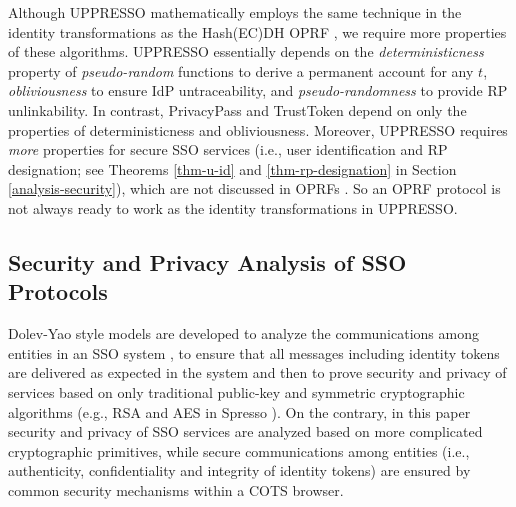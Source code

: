 Although UPPRESSO mathematically employs the same technique in the identity transformations as the Hash(EC)DH OPRF \cite{oprf-proved,voprf-proved}, we require more properties of these algorithms. %
UPPRESSO essentially 
depends on the \emph{deterministicness} property of \emph{pseudo-random} functions to derive a permanent account for any $t$, \emph{obliviousness} to ensure IdP untraceability, 
and \emph{pseudo-randomness} to provide RP unlinkability. 
In contrast, PrivacyPass and TrustToken \cite{privacypass,trusttoken} depend on only the properties of deterministicness and obliviousness.
Moreover, UPPRESSO requires \emph{more} properties for secure SSO services (i.e., user identification and RP designation; see Theorems \ref{thm-u-id} and \ref{thm-rp-designation} in Section \ref{analysis-security}),
    which are not discussed in OPRFs \cite{sok-oprf,oprf-proved,voprf-proved}.
So an OPRF protocol is not always ready to work as the identity transformations in UPPRESSO.

\subsection{Security and Privacy Analysis of SSO Protocols}
Dolev-Yao style models are developed to analyze the communications among entities in an SSO system \cite{SPRESSO,BrowserID,FettKS14}, to ensure that all messages including identity tokens are delivered as expected in the system
        and then to prove security and privacy of services 
        based on only traditional public-key and symmetric cryptographic algorithms (e.g., RSA and AES in Spresso \cite{SPRESSO}).
On the contrary, in this paper security and privacy of SSO services are analyzed based on more complicated cryptographic primitives,
    while secure communications among entities (i.e., authenticity, confidentiality and integrity of identity tokens) are ensured by common security mechanisms within a COTS browser.

